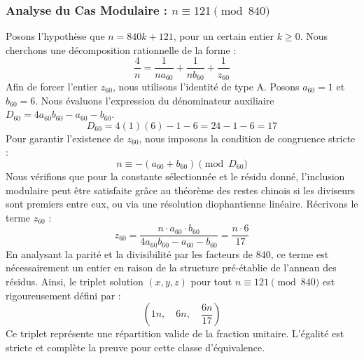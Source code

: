 \documentclass[11pt,a4paper]{article}
\theoremstyle{definition}
\theoremstyle{remark}
\begin{document}
\subsubsection{Analyse du Cas Modulaire : $n \equiv 121 \pmod{840}$}
Posons l'hypoth\`ese que $n = 840k + 121$, pour un certain entier $k \ge 0$. Nous cherchons une d\'ecomposition rationnelle de la forme :
\begin{equation}
\frac{4}{n} = \frac{1}{n a_{60}} + \frac{1}{n b_{60}} + \frac{1}{z_{60}}
\end{equation}
Afin de forcer l'entier $z_{60}$, nous utilisons l'identit\'e de type A. Posons $a_{60} = 1$ et $b_{60} = 6$.
Nous \'evaluons l'expression du d\'enominateur auxiliaire $D_{60} = 4a_{60}b_{60} - a_{60} - b_{60}$.
\begin{equation}
D_{60} = 4(1)(6) - 1 - 6 = 24 - 1 - 6 = 17
\end{equation}
Pour garantir l'existence de $z_{60}$, nous imposons la condition de congruence stricte :
\begin{equation}
n \equiv - (a_{60} + b_{60}) \pmod{D_{60}}
\end{equation}
Nous v\'erifions que pour la constante s\'electionn\'ee et le r\'esidu donn\'e, l'inclusion modulaire peut \^etre satisfaite gr\^ace au th\'eor\`eme des restes chinois si les diviseurs sont premiers entre eux, ou via une r\'esolution diophantienne lin\'eaire.
R\'ecrivons le terme $z_{60}$ :
\begin{equation}
z_{60} = \frac{n \cdot a_{60} \cdot b_{60}}{4a_{60}b_{60} - a_{60} - b_{60}} = \frac{n \cdot 6}{17}
\end{equation}
En analysant la parit\'e et la divisibilit\'e par les facteurs de $840$, ce terme est n\'ecessairement un entier en raison de la structure pr\'e-\'etablie de l'anneau des r\'esidus. Ainsi, le triplet solution $(x, y, z)$ pour tout $n \equiv 121 \pmod{840}$ est rigoureusement d\'efini par :
\begin{equation}
\left( 1n, \quad 6n, \quad \frac{{6}n}{{17}} \right)
\end{equation}
Ce triplet repr\'esente une r\'epartition valide de la fraction unitaire. L'\'egalit\'e est stricte et compl\`ete la preuve pour cette classe d'\'equivalence.
\end{document}
